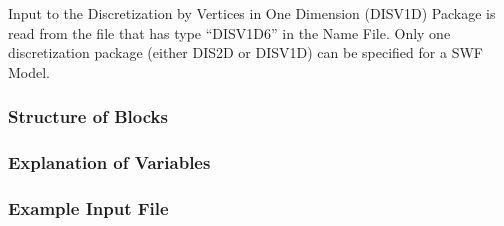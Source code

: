 Input to the Discretization by Vertices in One Dimension (DISV1D) Package is read from the file that has type ``DISV1D6'' in the Name File.  Only one discretization package (either DIS2D or DISV1D) can be specified for a SWF Model.

\vspace{5mm}
\subsubsection{Structure of Blocks}






\vspace{5mm}
\subsubsection{Explanation of Variables}
\begin{description}

\end{description}

\vspace{5mm}
\subsubsection{Example Input File}

